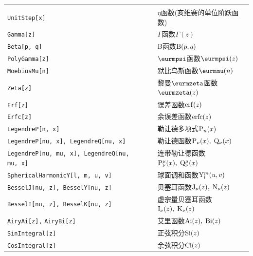 \documentclass[UTF8,a4paper,10pt]{ctexart}
\begin{document}
\par
\tabcolsep=2pt
\noindent
\begin{center}
\begin{tabular}{p{9cm}l|lp{5cm}}
\hline\hline\hline
& & & \\[-13pt]
\verb+UnitStep[x]+                    & \qquad & & $\eta$函数(亥维赛的单位阶跃函数)\\[-0.20pt]
\verb-Gamma[z]-                       & \qquad & & $\Gamma$函数$\Gamma (z)$ \\[-0.20pt]
\verb-Beta[p, q]-                     & \qquad & & B函数${\rm B} (p, q)$ \\[-0.20pt]
\verb-PolyGamma[z]-                   & \qquad & & $\eurmpsi$函数$\eurmpsi (z)$ \\[-0.20pt]
\verb+MoebiusMu[n]+                   & \qquad & & 默比乌斯函数$\eurmmu (n)$ \\[-0.20pt]
\verb-Zeta[z]-                        & \qquad & & 黎曼$\eurmzeta$函数$\eurmzeta (z)$ \\[-0.20pt]
\verb-Erf[z]-                         & \qquad & & 误差函数${\rm erf} (z)$ \\[-0.20pt]
\verb-Erfc[z]-                        & \qquad & & 余误差函数${\rm erfc} (z)$ \\[-0.20pt]
\verb-LegendreP[n, x]-                & \qquad & & 勒让德多项式${\rm P}_n (x)$ \\[-0.20pt]
\verb-LegendreP[nu, x], LegendreQ[nu, x]-
                                      & \qquad & & 勒让德函数${\rm P}_{\nu} (x), \; {\rm Q}_{\nu} (x)$ \\[-0.20pt]
\verb-LegendreP[nu, mu, x], LegendreQ[nu, mu, x]-
                                      & \qquad & & 连带勒让德函数${\rm P}_{\nu}^{\mu} (x), \; {\rm Q}_{\nu}^{\mu} (x)$ \\[-0.20pt]
\verb-SphericalHarmonicY[l, m, u, v]- & \qquad & & 球面调和函数${\rm Y}_l^m (u, v)$ \\[-0.20pt]
\verb-BesselJ[nu, z], BesselY[nu, z]- & \qquad & & 贝塞耳函数${\rm J}_{\nu} (z), \; {\rm N}_{\nu} (z)$ \\[-0.20pt]
\verb-BesselI[nu, z], BesselK[nu, z]- & \qquad & & 虚宗量贝塞耳函数${\rm I}_{\nu} (z), \; {\rm K}_{\nu} (z)$ \\[-0.20pt]
\verb-AiryAi[z],- \; \verb-AiryBi[z]- & \qquad & & 艾里函数${\rm Ai} (z), \; {\rm Bi} (z)$ \\[-0.20pt]
\verb-SinIntegral[z]-                 & \qquad & & 正弦积分${\rm Si} (z)$ \\[-0.20pt]
\verb-CosIntegral[z]-                 & \qquad & & 余弦积分${\rm Ci} (z)$ \\[-0.20pt]

\end{tabular}
\end{center}
\end{document}
